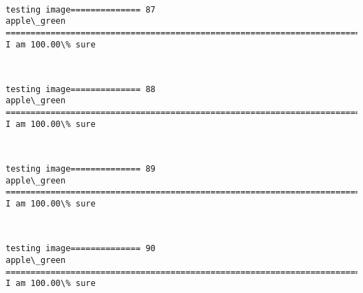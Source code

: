 \documentclass[11pt]{article}
\begin{document}
    \begin{center}
    \end{center}
    { \hspace*{\fill} \\}
    
    \begin{Verbatim}[commandchars=\\\{\}]
testing image============== 87
apple\_green
============================================================================
I am 100.00\% sure

    \end{Verbatim}

    \begin{center}
    \end{center}
    { \hspace*{\fill} \\}
    
    \begin{Verbatim}[commandchars=\\\{\}]
testing image============== 88
apple\_green
============================================================================
I am 100.00\% sure

    \end{Verbatim}

    \begin{center}
    \end{center}
    { \hspace*{\fill} \\}
    
    \begin{Verbatim}[commandchars=\\\{\}]
testing image============== 89
apple\_green
============================================================================
I am 100.00\% sure

    \end{Verbatim}

    \begin{center}
    \end{center}
    { \hspace*{\fill} \\}
    
    \begin{Verbatim}[commandchars=\\\{\}]
testing image============== 90
apple\_green
============================================================================
I am 100.00\% sure

    \end{Verbatim}
\end{document}
